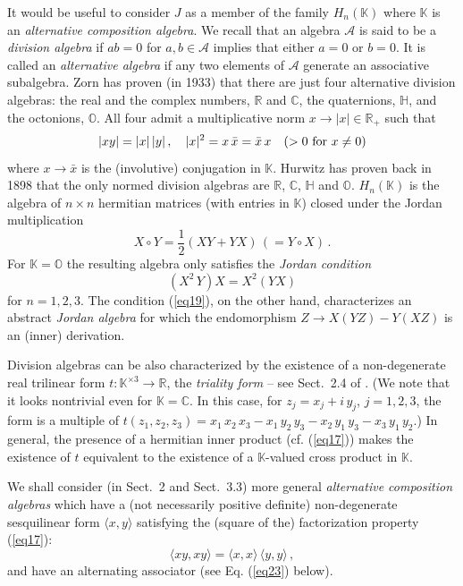 \documentclass{article}
\newcommand{\be}{\begin{equation}}
\newcommand{\ee}{\end{equation}}
\begin{document}
It would be useful to consider $J$ as a member of the family $H_n ({\mathbb K})$ where ${\mathbb K}$ is an {\it alternative composition algebra}. We recall that an algebra ${\mathcal A}$ is said to be a {\it division algebra} if $ab=0$ for $a,b \in {\mathcal A}$ implies that either $a=0$ or $b=0$. It is called an {\it alternative algebra} if any two elements of ${\mathcal A}$ generate an associative subalgebra. Zorn has proven (in 1933) that there are just four  alternative division algebras: the real and the complex numbers, ${\mathbb R}$ and ${\mathbb C}$, the quaternions, ${\mathbb H}$, and the octonions, ${\mathbb O}$. All four admit a multiplicative norm $x \to \vert x \vert \in {\mathbb R}_+$ such that
\be
\label{eq17}
\vert xy \vert = \vert x \vert \, \vert y \vert \, , \quad \vert x \vert^2 = x \, \bar x = \bar x \, x \quad (>0 \ {\rm for} \ x \ne 0)
\ee
where $x \to \bar x$ is the (involutive) conjugation in ${\mathbb K}$. Hurwitz has proven back in 1898 that the only normed division algebras are ${\mathbb R}$, ${\mathbb C}$, ${\mathbb H}$ and ${\mathbb O}$. $H_n ({\mathbb K})$ is the algebra of $n \times n$ hermitian matrices (with entries in ${\mathbb K}$) closed under the Jordan multiplication
\be
\label{eq18}
X \circ Y = \frac12 (XY + YX) \, (= Y \circ X) \, .
\ee
For ${\mathbb K} = {\mathbb O}$ the resulting algebra only satisfies the {\it Jordan condition}
\be
\label{eq19}
(X^2 \, Y) X = X^2 (YX)
\ee
for $n =1,2,3$. The condition (\ref{eq19}), on the other hand, characterizes an abstract {\it Jordan algebra} for which the endomorphism $Z \to X(YZ) - Y(XZ)$ is an (inner) derivation.

\smallskip

Division algebras can be also characterized by the existence of a non-degene\-rate real trilinear form $t : {\mathbb K}^{\times 3} \to {\mathbb R}$, the {\it triality form} -- see Sect.~2.4 of \cite{B}. (We note that it looks nontrivial even for ${\mathbb K} = {\mathbb C}$. In this case, for $z_j = x_j + i \, y_j$, $j=1,2,3$, the form is a multiple of $t(z_1 , z_2 , z_3) = x_1 \, x_2 \, x_3 - x_1 \, y_2 \, y_3 - x_2 \, y_1 \, y_3 - x_3 \, y_1 \, y_2$.) In general, the presence of a hermitian inner product (cf. (\ref{eq17})) makes the existence of $t$ equivalent to the existence of a ${\mathbb K}$-valued cross product in ${\mathbb K}$.

\smallskip

We shall consider (in Sect.~2 and Sect.~3.3) more general {\it alternative composition algebras} which have a (not necessarily positive definite) non-degenerate sesquilinear form $\langle x,y \rangle$ satisfying the (square of the) factorization property (\ref{eq17}):
\be
\label{eq110}
\langle xy , xy \rangle = \langle x,x \rangle \, \langle y,y \rangle \, ,
\ee
and have an alternating associator (see Eq. (\ref{eq23}) below).
\end{document}
